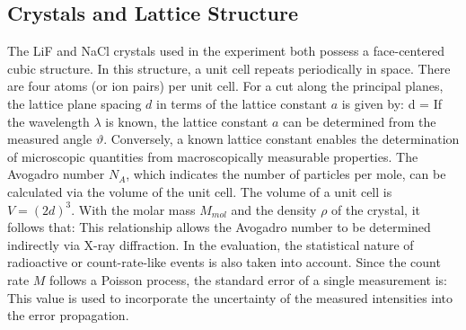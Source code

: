 \subsection{Crystals and Lattice Structure}
The LiF and NaCl crystals used in the experiment both possess a face-centered cubic structure. In this structure, a unit cell repeats periodically in space. There are four atoms (or ion pairs) per unit cell. For a cut along the principal planes, the lattice plane spacing $d$ in terms of the lattice constant $a$ is given by:
{
    d = 
    }
If the wavelength $\lambda$ is known, the lattice constant $a$ can be determined from the measured angle $\vartheta$. Conversely, a known lattice constant enables the determination of microscopic quantities from macroscopically measurable properties. The Avogadro number $N_A$, which indicates the number of particles per mole, can be calculated via the volume of the unit cell. The volume of a unit cell is $V = (2d)^3$. With the molar mass $M_{mol}$ and the density $\rho$ of the crystal, it follows that:
This relationship allows the Avogadro number to be determined indirectly via X-ray diffraction.
In the evaluation, the statistical nature of radioactive or count-rate-like events is also taken into account. Since the count rate $M$ follows a Poisson process, the standard error of a single measurement is:
This value is used to incorporate the uncertainty of the measured intensities into the error propagation.
